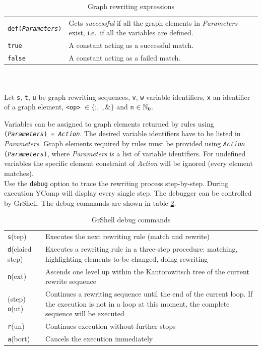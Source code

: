 \begin{table}[htbp]
\begin{tabularx}{\linewidth}{|lX|}
\texttt{def(\emph{Parameters})} & Gets \emph{successful} if all the graph elements in \emph{Parameters} exist, i.e.\ if all the variables are defined.\\
\texttt{true}	& A constant acting as a successful match.\\
\texttt{false}	& A constant acting as a failed match.\\ \hline
\end{tabularx}\\
\\ \centering
{\small Let \texttt{s}, \texttt{t}, \texttt{u} be graph rewriting sequences, \texttt{v}, \texttt{w} variable identifiers, \texttt{x} an identifier of a graph element, \texttt{<op>} $\in \{\texttt{;}, \texttt{|}, \texttt{\&}\}$ and \texttt{n} $\in \mathbb{N}_0$.}
\caption{Graph rewriting expressions}
\label{ruletab}
\end{table}
\makeatother

Variables can be assigned to graph elements returned by rules using \texttt{(\emph{Para\-meters}) = \emph{Action}}. The desired variable identifiers have to be listed in \emph{Parameters}. Graph elements required by rules must be provided using \texttt{\emph{Action} (\emph{Para\-meters})}, where \emph{Parameters} is a list of variable identifiers. For undefined variables the specific element constraint of \emph{Action} will be ignored (every element matches).\\

Use the \texttt{debug} option to trace the rewriting process step-by-step. During execution YComp will display every single step. The debugger can be controlled by GrShell. The debug commands are shown in table \ref{tabdebug}.
\begin{table}[htbp]
  \begin{tabularx}{\linewidth}{|lX|} \hline
  \texttt{s}(tep) & Executes the next rewriting rule (match and rewrite)\\
  \texttt{d}(elaied step) & Executes a rewriting rule in a three-step procedure: matching, highlighting elements to be changed, doing rewriting \\
  \texttt{n}(ext) & Ascends one level up within the Kantorowitsch tree of the current rewrite sequence\\
  (step) \texttt{o}(ut) & Continues a rewriting sequence until the end of the current loop. If the execution is not in a loop at this moment, the complete sequence will be executed\\
  \texttt{r}(un) &  Continues execution without further stops\\
  \texttt{a}(bort) & Cancels the execution immediately\\ \hline 
  \end{tabularx}
  \caption{GrShell debug commands}
  \label{tabdebug}
\end{table}

